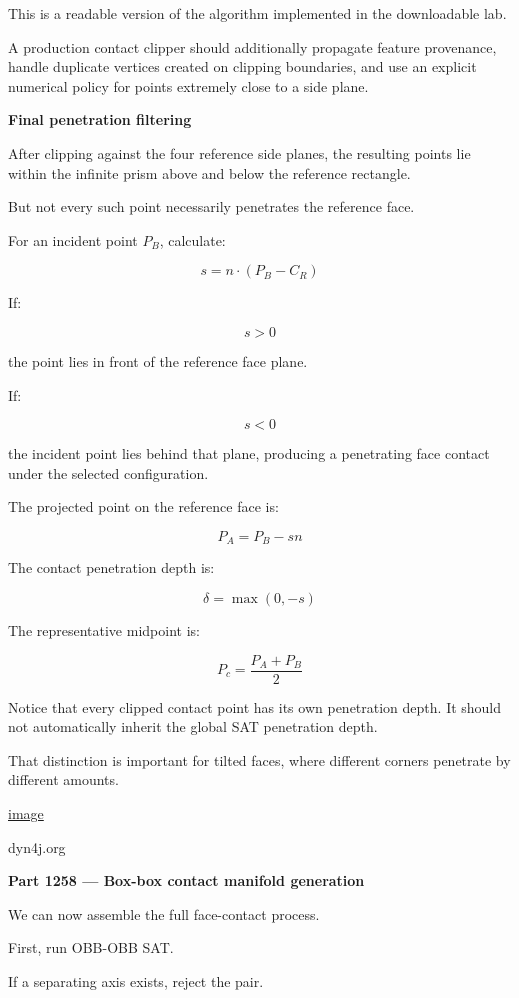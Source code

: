 This is a readable version of the algorithm implemented in the downloadable lab.

A production contact clipper should additionally propagate feature provenance, handle duplicate vertices created on clipping boundaries, and use an explicit numerical policy for points extremely close to a side plane.

\textbf{Final penetration filtering}

After clipping against the four reference side planes, the resulting points lie within the infinite prism above and below the reference rectangle.

But not every such point necessarily penetrates the reference face.

For an incident point \(P_B\), calculate:

\[
\boxed{ s=n\cdot(P_B-C_R) }
\]

If:

\[
s>0
\]

the point lies in front of the reference face plane.

If:

\[
s<0
\]

the incident point lies behind that plane, producing a penetrating face contact under the selected configuration.

The projected point on the reference face is:

\[
\boxed{ P_A=P_B-sn }
\]

The contact penetration depth is:

\[
\boxed{ \delta=\max(0,-s) }
\]

The representative midpoint is:

\[
\boxed{ P_c=\frac{P_A+P_B}{2} }
\]

Notice that every clipped contact point has its own penetration depth. It should not automatically inherit the global SAT penetration depth.

That distinction is important for tilted faces, where different corners penetrate by different amounts. 

\href{https://www.google.com/s2/favicons?domain=https://dyn4j.org&sz=32}{image}

dyn4j.org

\textbf{Part 1258 --- Box-box contact manifold generation}

We can now assemble the full face-contact process.

First, run OBB-OBB SAT.

If a separating axis exists, reject the pair.

